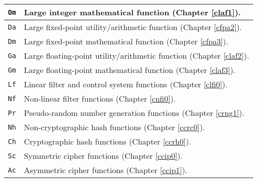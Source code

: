\begin{table}
\begin{center}
\begin{tabular}{|l|l|}
\hline
\texttt{Om}    & Large integer mathematical function (Chapter \ref{claf1}).                  \\
\hline
\texttt{Da}    & Large fixed-point utility/arithmetic function (Chapter \ref{cfpa2}).        \\
\hline
\texttt{Dm}    & Large fixed-point mathematical function (Chapter \ref{cfpa3}).              \\
\hline
\texttt{Ga}    & Large floating-point utility/arithmetic function (Chapter \ref{claf2}).     \\
\hline
\texttt{Gm}    & Large floating-point mathematical function (Chapter \ref{claf3}).           \\
\hline
\texttt{Lf}    & Linear filter and control system functions (Chapter \ref{clfi0}).           \\
\hline
\texttt{Nf}    & Non-linear filter functions (Chapter \ref{cnfi0}).                          \\
\hline
\texttt{Pr}    & Pseudo-random number generation functions (Chapter \ref{crng1}).            \\
\hline
\texttt{Nh}    & Non-cryptographic hash functions (Chapter \ref{ccrc0}).                     \\
\hline
\texttt{Ch}    & Cryptographic hash functions (Chapter \ref{ccrh0}).                         \\
\hline
\texttt{Sc}    & Symmetric cipher functions (Chapter \ref{ccip0}).                           \\
\hline
\texttt{Ac}    & Asymmetric cipher functions (Chapter \ref{ccip1}).                          \\
\hline
\end{tabular}
\end{center}
\end{table}


